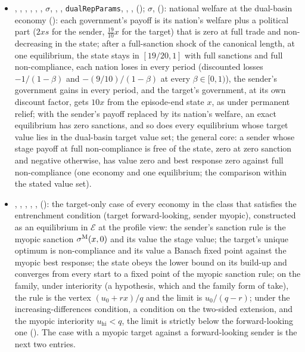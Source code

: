 \begin{itemize}[leftmargin=1.4em,itemsep=1pt]
\item {}, , , , , , $\sigma$, , , \texttt{dualRepParams}, , ,  (); $\sigma$,  (): national welfare at the dual-basin economy (): each government's payoff is its nation's welfare plus a political part ($2xs$ for the sender, $\tfrac{19}{10}x$ for the target) that is zero at full trade and non-decreasing in the state; after a full-sanction shock of the canonical length, at one equilibrium, the state stays in $[19/20,1]$ with full sanctions and full non-compliance, each nation loses in every period (discounted losses $-1/(1-\beta)$ and $-(9/10)/(1-\beta)$ at every $\beta\in[0,1)$), the sender's government gains in every period, and the target's government, at its own discount factor, gets $10x$ from the episode-end state $x$, as under permanent relief; with the sender's payoff replaced by its nation's welfare, an exact equilibrium has zero sanctions, and so does every equilibrium whose target value lies in the dual-basin target value set; the general core: a sender whose stage payoff at full non-compliance is free of the state, zero at zero sanction and negative otherwise, has value zero and best response zero against full non-compliance (one economy and one equilibrium; the comparison within the stated value set).
\item {}, , , , ,  (): the target-only case of every economy in the class that satisfies the entrenchment condition (target forward-looking, sender myopic), constructed as an equilibrium in $\mathcal E$ at the profile view: the sender's sanction rule is the myopic sanction $\sigma^{\mathrm{M}}(x,0)$ and its value the stage value; the target's unique optimum is non-compliance and its value a Banach fixed point against the myopic best response; the state obeys the lower bound on its build-up and converges from every start to a fixed point of the myopic sanction rule; on the family, under interiority (a hypothesis, which  and the family form of  take), the rule is the vertex $(u_0+rx)/q$ and the limit is $u_0/(q-r)$; under the increasing-differences condition, a condition on the two-sided extension, and the myopic interiority $u_{\mathrm{hi}}<q$, the limit is strictly below the forward-looking one (). The case with a myopic target against a forward-looking sender is the next two entries.

\end{itemize}
